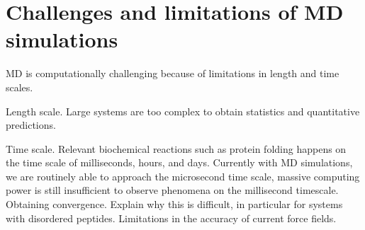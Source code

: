 \begin{outline}
\end{outline}

\section{Challenges and limitations of MD simulations}
\begin{outline}
	\1 MD is computationally challenging because of limitations in length and time scales.
	
		\2 Length scale. Large systems are too complex to obtain statistics and quantitative predictions.
			
		\2 Time scale. Relevant biochemical reactions such as protein folding happens on the time scale of milliseconds, hours, and days. Currently with MD simulations, we are routinely able to approach the microsecond time scale, massive computing power is still insufficient to observe phenomena on the millisecond timescale. %
		\2 Obtaining convergence. Explain why this is difficult, in particular for systems with disordered peptides.
	\1 Limitations in the accuracy of current force fields.
\end{outline}		

